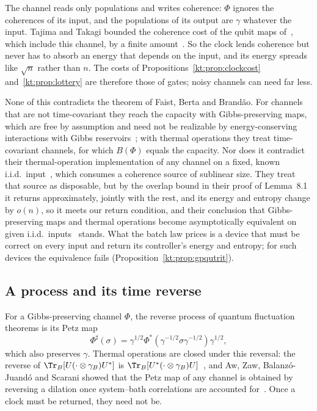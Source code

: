 The channel reads only populations and writes coherence: $\Phi$ ignores the coherences of its input, and the populations of its output are $\gamma$ whatever the input. Tajima and Takagi bounded the coherence cost of the qubit maps of~\cite{FOR15}, which include this channel, by a finite amount~\cite[Suppl.\ Sec.~IV]{TajimaTakagi25}. So the clock lends coherence but never has to absorb an energy that depends on the input, and its energy spreads like $\sqrt n$ rather than $n$. The costs of Propositions~\ref{kt:prop:clockcost} and~\ref{kt:prop:lottery} are therefore those of gates; noisy channels can need far less.

None of this contradicts the theorem of Faist, Berta and Brand\~ao. For channels that are not time-covariant they reach the capacity with Gibbs-preserving maps, which are free by assumption and need not be realizable by energy-conserving interactions with Gibbs reservoirs~\cite{FBB19,FOR15,TajimaTakagi25}; with thermal operations they treat time-covariant channels, for which $B(\Phi)$ equals the capacity. Nor does it contradict their thermal-operation implementation of any channel on a fixed, known i.i.d.\ input~\cite[Prop.~8.3]{FBB21}, which consumes a coherence source of sublinear size. They treat that source as disposable, but by the overlap bound in their proof of Lemma~8.1~\cite[Eq.~(8.25)]{FBB21} it returns approximately, jointly with the rest, and its energy and entropy change by $o(n)$, so it meets our return condition, and their conclusion that Gibbs-preserving maps and thermal operations become asymptotically equivalent on given i.i.d.\ inputs~\cite{FBB19} stands. What the batch law prices is a device that must be correct on every input and return its controller's energy and entropy; for such devices the equivalence fails (Proposition~\ref{kt:prop:gpqutrit}).

\subsection{A process and its time reverse}\label{kt:sec:arrow}

For a Gibbs-preserving channel $\Phi$, the reverse process of quantum fluctuation theorems is its Petz map~\cite{Crooks08,KwonKim19}
\[
\Phi^\sharp(\sigma)=\gamma^{1/2}\Phi^*(\gamma^{-1/2}\sigma\gamma^{-1/2})\gamma^{1/2},
\]
which also preserves $\gamma$. Thermal operations are closed under this reversal: the reverse of $\Tr_B[U(\cdot\otimes\gamma_B)U^*]$ is $\Tr_B[U^*(\cdot\otimes\gamma_B)U]$~\cite{Crooks08,AWWW18}, and Aw, Zaw, Balanz\'o-Juand\'o and Scarani showed that the Petz map of any channel is obtained by reversing a dilation once system--bath correlations are accounted for~\cite{AwZawBalanzoScarani24}. Once a clock must be returned, they need not be.

